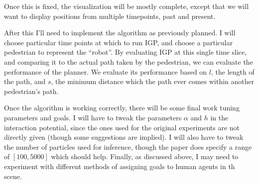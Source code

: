 \documentclass[a4paper,11pt,headings=small]{article}
\begin{document}
Once this is fixed, the visualization will be mostly complete, except that we will want to display positions from multiple timepoints, past and present.

After this I'll need to implement the algorithm as previously planned. I will choose particular time points at which to run IGP, and choose a particular pedestrian to represent the ``robot''. By evaluating IGP at this single time slice, and comparing it to the actual path taken by the pedestrian, we can evaluate the performance of the planner. We evaluate its performance based on $l$, the length of the path, and $s$, the minimum distance which the path ever comes within another pedestrian's path.

Once the algorithm is working correctly, there will be some final work tuning parameters and goals. I will have to tweak the parameters $\alpha$ and $h$ in the interaction potential, since the ones used for the original experiments are not directly given (though some suggestions are implied). I will also have to tweak the number of particles used for inference, though the paper does specify a range of $[100,5000]$ which should help. Finally, as discussed above, I may need to experiment with different methods of assigning goals to human agents in th scene.




\end{document}
